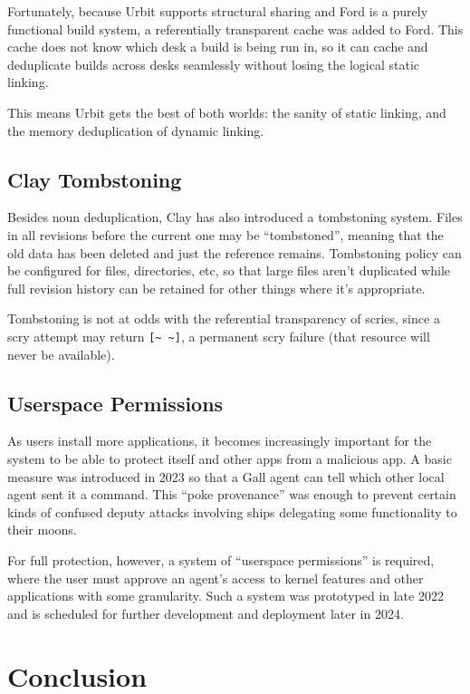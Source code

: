 \documentclass[twoside]{article}
\begin{document}
Fortunately, because Urbit supports structural sharing and Ford is a purely functional build system, a referentially transparent cache was added to Ford.  This cache does not know which desk a build is being run in, so it can cache and deduplicate builds across desks seamlessly without losing the logical static linking.

This means Urbit gets the best of both worlds: the sanity of static linking, and the memory deduplication of dynamic linking.

\subsection{Clay Tombstoning}

Besides noun deduplication, Clay has also introduced a tombstoning system.  Files in all revisions before the current one may be ``tombstoned'', meaning that the old data has been deleted and just the reference remains.  Tombstoning policy can be configured for files, directories, etc, so that large files aren't duplicated while full revision history can be retained for other things where it's appropriate.

Tombstoning is not at odds with the referential transparency of scries, since a scry attempt may return \lstinline[style=inlinecode]{[~ ~]}, a permanent scry failure (that resource will never be available).

\subsection{Userspace Permissions}

As users install more applications, it becomes increasingly important for the system to be able to protect itself and other apps from a malicious app.  A basic measure was introduced in 2023 so that a Gall agent can tell which other local agent sent it a command.  This ``poke provenance'' was enough to prevent certain kinds of confused deputy attacks involving ships delegating some functionality to their moons.

For full protection, however, a system of ``userspace permissions'' is required, where the user must approve an agent's access to kernel features and other applications with some granularity.  Such a system was prototyped in late 2022 and is scheduled for further development and deployment later in 2024.

\section{Conclusion}
\end{document}
